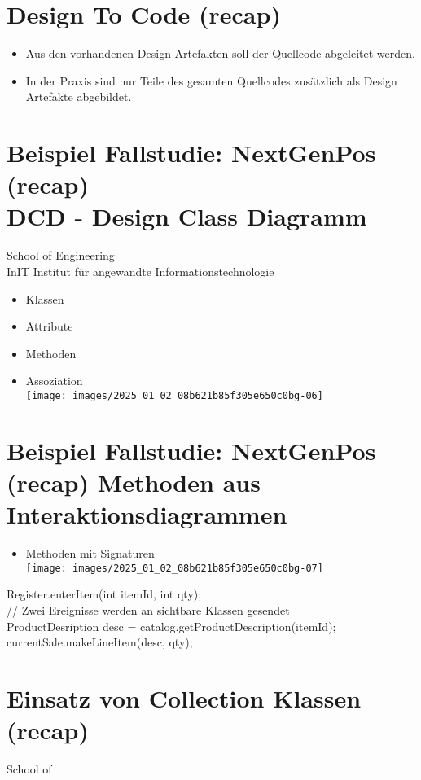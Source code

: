\documentclass[10pt]{article}
\begin{document}
\section*{Design To Code (recap)}
\begin{itemize}
  \item Aus den vorhandenen Design Artefakten soll der Quellcode abgeleitet werden.
  \item In der Praxis sind nur Teile des gesamten Quellcodes zusätzlich als Design Artefakte abgebildet.
\end{itemize}

\section*{Beispiel Fallstudie: NextGenPos (recap) \\
 DCD - Design Class Diagramm}
School of Engineering\\
InIT Institut für angewandte Informationstechnologie

\begin{itemize}
  \item Klassen
  \item Attribute
  \item Methoden
  \item Assoziation\\
\texttt{[image: images/2025\_01\_02\_08b621b85f305e650c0bg-06]}
\end{itemize}

\section*{Beispiel Fallstudie: NextGenPos (recap) Methoden aus Interaktionsdiagrammen}
\begin{itemize}
  \item Methoden mit Signaturen\\
\texttt{[image: images/2025\_01\_02\_08b621b85f305e650c0bg-07]}
\end{itemize}

Register.enterItem(int itemId, int qty);\\
// Zwei Ereignisse werden an sichtbare Klassen gesendet\\
ProductDesription desc = catalog.getProductDescription(itemId); currentSale.makeLineItem(desc, qty);

\section*{Einsatz von Collection Klassen (recap)}
School of
\end{document}
